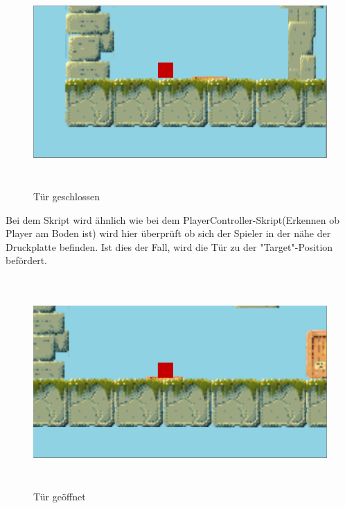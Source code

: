 \begin{figure}[H]
	\includegraphics[height=8cm]{images/TuerZu.png}
	\caption{Tür geschlossen}
\end{figure}
Bei dem Skript wird ähnlich wie bei dem PlayerController-Skript(Erkennen ob Player am Boden ist) wird hier überprüft ob sich der Spieler in der nähe der Druckplatte befinden. Ist dies der Fall, wird die Tür zu der "Target"-Position befördert. 
\begin{figure}[H]
	\includegraphics[height=8cm]{images/TuerOffen.png}
	\caption{Tür geöffnet}
\end{figure}

